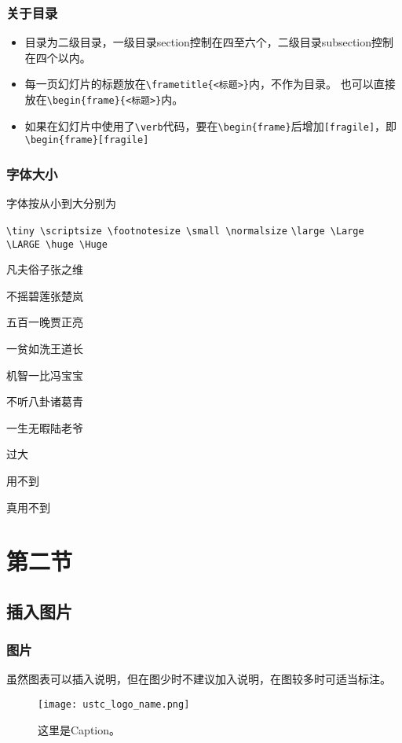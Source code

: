 \documentclass[10pt]{beamer}	%
\newcommand{\blue}{\color{njuPurple}}
\begin{document}
\begin{frame}[fragile]
\frametitle{关于目录}
\begin{itemize}
\item 目录为{\blue 二级目录}，一级目录section控制在四至六个，二级目录subsection控制在四个以内。
\item 每一页幻灯片的标题放在\verb|\frametitle{<标题>}|内，不作为目录。
也可以直接放在\verb|\begin{frame}{<标题>}|内。
\item 如果在幻灯片中使用了\verb|\verb|代码，要在\verb|\begin{frame}|后增加\verb|[fragile]|，即\verb|\begin{frame}[fragile]|
\end{itemize}
\end{frame}

\begin{frame}[fragile]
\frametitle{字体大小}
字体按从小到大分别为

\verb|\tiny \scriptsize \footnotesize \small \normalsize|
\verb|\large \Large \LARGE \huge \Huge|

\tiny 
凡夫俗子张之维

\scriptsize
不摇碧莲张楚岚

\footnotesize
五百一晚贾正亮

\small
一贫如洗王道长

\normalsize
机智一比冯宝宝

\large
不听八卦诸葛青

\Large
一生无暇陆老爷

\LARGE
过大

\huge
用不到

\Huge
真用不到
\end{frame}

\section{第二节}

\subsection{插入图片}

\begin{frame}
\frametitle{图片}
虽然图表可以插入说明，但在图少时不建议加入说明，在图较多时可适当标注。
\begin{figure}
\centering
\texttt{[image: ustc\_logo\_name.png]}
\caption{这里是Caption。}
\end{figure}
\end{frame}
\end{document}
